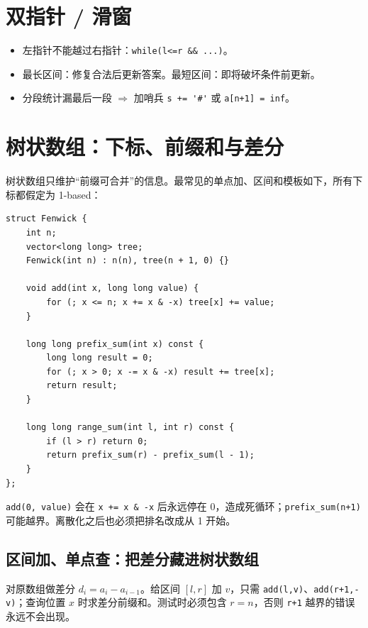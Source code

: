 \documentclass[UTF8,openany,oneside,zihao=-4]{ctexbook}
\begin{document}
\section{双指针 / 滑窗}

\begin{itemize}
  \item 左指针不能越过右指针：\lstinline|while(l<=r && ...)|。
  \item 最长区间：修复合法后更新答案。最短区间：即将破坏条件前更新。
  \item 分段统计漏最后一段 $\Rightarrow$ 加哨兵 \lstinline|s += '#'| 或 \lstinline|a[n+1] = inf|。
\end{itemize}

\section{树状数组：下标、前缀和与差分}

树状数组只维护“前缀可合并”的信息。最常见的单点加、区间和模板如下，所有下标都假定为 1-based：

\begin{lstlisting}
struct Fenwick {
    int n;
    vector<long long> tree;
    Fenwick(int n) : n(n), tree(n + 1, 0) {}

    void add(int x, long long value) {
        for (; x <= n; x += x & -x) tree[x] += value;
    }

    long long prefix_sum(int x) const {
        long long result = 0;
        for (; x > 0; x -= x & -x) result += tree[x];
        return result;
    }

    long long range_sum(int l, int r) const {
        if (l > r) return 0;
        return prefix_sum(r) - prefix_sum(l - 1);
    }
};
\end{lstlisting}

\begin{warn}
 \lstinline|add(0, value)| 会在 \lstinline|x += x & -x| 后永远停在 0，造成死循环；\lstinline|prefix_sum(n+1)| 可能越界。离散化之后也必须把排名改成从 1 开始。
\end{warn}

\subsection{区间加、单点查：把差分藏进树状数组}

对原数组做差分 $d_i=a_i-a_{i-1}$。给区间 $[l,r]$ 加 $v$，只需 \lstinline|add(l,v)|、\lstinline|add(r+1,-v)|；查询位置 $x$ 时求差分前缀和。测试时必须包含 $r=n$，否则 \lstinline|r+1| 越界的错误永远不会出现。
\end{document}
